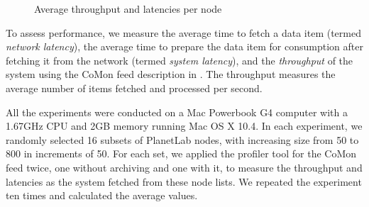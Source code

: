 \begin{figure}[t]
\begin{center}
\caption{Average throughput and latencies per node}
\label{fig:throughput}
\end{center}
\end{figure}

To assess performance, we measure 
the average time to fetch a data item (termed {\em network latency}), 
the average time to prepare the data item for consumption
after fetching it from the network (termed {\em system latency}),
and the {\em throughput} of the system using the CoMon feed
description in . 
The throughput measures the average
number of items fetched and processed per second. 

All the experiments were conducted on a Mac Powerbook G4 computer
with a 1.67GHz CPU and 2GB memory running Mac OS X 10.4.
In each experiment, we randomly selected 16 subsets of PlanetLab
nodes, with increasing size from 50 to 800 in increments of 50.
For each set, we applied the profiler tool for the CoMon feed
twice, one without archiving and one with it, to measure the
throughput and latencies as the system fetched from these node lists. 
We repeated the experiment ten times and calculated the average values.


